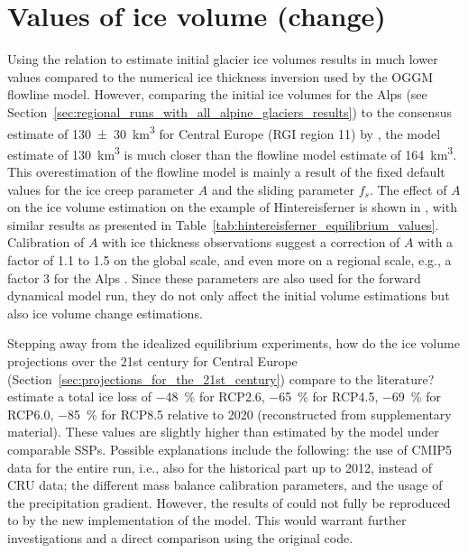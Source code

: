     \section{Values of ice volume (change)} %
    \label{sec:relative_and_absolute_values_of_ice_volume_change}

        Using the \vas{} relation to estimate initial glacier ice volumes results in much lower values compared to the numerical ice thickness inversion \citep[cf.][]{Farinotti2009} used by the OGGM flowline model. However, comparing the initial ice volumes for the Alps (see Section~\ref{sec:regional_runs_with_all_alpine_glaciers_results}) to the consensus estimate of 130\SI{\pm30}{\cubic\kilo\meter} for Central Europe (RGI region 11) by \citet{Farinotti2019}, the \vas{} model estimate of \SI{130}{\cubic\kilo\meter} is much closer than the flowline model estimate of \SI{164}{\cubic\kilo\meter}. This overestimation of the flowline model is mainly a result of the fixed default values for the ice creep parameter $A$ and the sliding parameter $f_s$. The effect of $A$ on the ice volume estimation on the example of Hintereisferner is shown in \citet[Figure 6]{Maussion2019}, with similar results as presented in Table~\ref{tab:hintereisferner_equilibrium_values}. Calibration of $A$ with ice thickness observations suggest a correction of $A$ with a factor of 1.1 to 1.5 on the global scale, and even more on a regional scale, e.g., a factor 3 for the Alps \citep{OGGM-pitfalls}. Since these parameters are also used for the forward dynamical model run, they do not only affect the initial volume estimations but also ice volume change estimations.

        Stepping away from the idealized equilibrium experiments, how do the ice volume projections over  the 21st century for Central Europe (Section~\ref{sec:projections_for_the_21st_century}) compare to the literature? \citet[cf. Figure 21]{Marzeion2012b} estimate a total ice loss of \SI{-48}{\percent} for RCP2.6, \SI{-65}{\percent} for RCP4.5, \SI{-69}{\percent} for RCP6.0, \SI{-85}{\percent} for RCP8.5 relative to 2020 (reconstructed from supplementary material). These values are slightly higher than estimated by the \vas{} model under comparable SSPs. Possible explanations include the following: the use of CMIP5 data for the entire run, i.e., also for the historical part up to 2012, instead of CRU data; the different mass balance calibration parameters, and the usage of the precipitation gradient. However, the results of \citet{Marzeion2012b} could not fully be reproduced to by the new implementation of the \vas{} model. This would warrant further investigations and a direct comparison using the original code.

